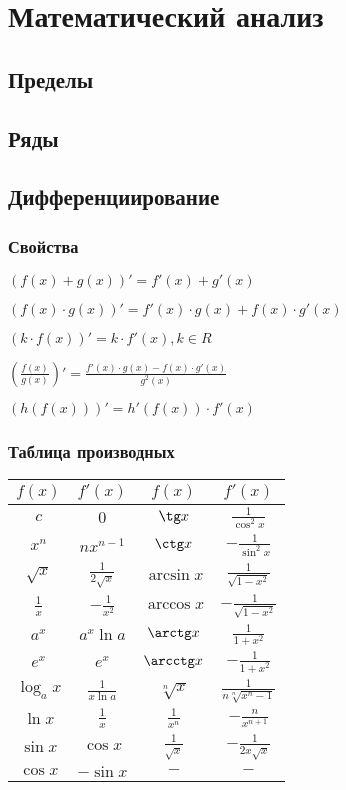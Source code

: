 \section{Математический анализ}

\subsection{Пределы}

\subsection{Ряды}

\subsection{Дифференциирование}

\subsubsection{Свойства}

$ (f(x) + g(x))' = f'(x) + g'(x) $

$ (f(x)\cdot g(x))' = f'(x)\cdot g(x) + f(x)\cdot g'(x) $

$ (k\cdot f(x))' = k\cdot f'(x), k \in R $

$ \left(\frac{f(x)}{g(x)}\right)' = \frac{f'(x)\cdot g(x) - f(x)\cdot g'(x)}{g^2(x)} $

$ (h(f(x)))' = h'(f(x)) \cdot f'(x) $

\subsubsection{Таблица производных}

\begin{tabular}[t]{||c|c||c|c||}
	\hline
		$ f(x) $ & $ f'(x) $ & $ f(x) $ &  $ f'(x) $ \tabularnewline
	\hline
		$ c $ & $ 0 $ & $ \tg x $ &  $ \frac{1}{\cos^2 x} $ \tabularnewline
	\hline
		$ x^n $ & $ nx^{n-1} $ & $ \ctg x $ &  $ -\frac{1}{\sin^2 x} $ \tabularnewline
	\hline
		$ \sqrt{x} $ & $ \frac{1}{2\sqrt{x}} $ & $ \arcsin x $ &  $ \frac{1}{\sqrt{1-x^2}} $ \tabularnewline
	\hline
		$ \frac{1}{x} $ & $ -\frac{1}{x^2} $ & $ \arccos x $ &  $ -\frac{1}{\sqrt{1-x^2}} $ \tabularnewline
	\hline
		$ a^x $ & $ a^x \ln a $ & $ \arctg x $ &  $ \frac{1}{1+x^2} $ \tabularnewline
	\hline
		$ e^x $ & $ e^x $ & $ \arcctg x $ &  $ -\frac{1}{1+x^2} $ \tabularnewline
	\hline
		$ \log_a x $ & $ \frac{1}{x \ln a} $ & $ \sqrt[n]{x} $ &  $ \frac{1}{n\sqrt[n]{x^n-1}} $ \tabularnewline
	\hline
		$ \ln x $ & $ \frac{1}{x} $ & $ \frac{1}{x^n} $ &  $ -\frac{n}{x^{n+1}} $ \tabularnewline
	\hline
		$ \sin x $ & $ \cos x $ & $ \frac{1}{\sqrt{x}} $ &  $ -\frac{1}{2x\sqrt{x}} $ \tabularnewline
	\hline
		$ \cos x $ & $ -\sin x $ & $ - $ &  $ - $ \tabularnewline
	\hline
\end{tabular}

